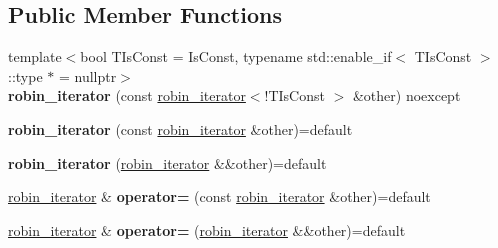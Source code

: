 \subsection*{Public Member Functions}
\begin{DoxyCompactItemize}
\item 
\mbox{\label{classtsl_1_1detail__robin__hash_1_1robin__hash_1_1robin__iterator_a902c3bd072c934ecacfdc474c7c3cb24}} 
{\footnotesize template$<$bool T\+Is\+Const = Is\+Const, typename std\+::enable\+\_\+if$<$ T\+Is\+Const $>$\+::type $\ast$  = nullptr$>$ }\\{\bfseries robin\+\_\+iterator} (const \mbox{\hyperlink{classtsl_1_1detail__robin__hash_1_1robin__hash_1_1robin__iterator}{robin\+\_\+iterator}}$<$!T\+Is\+Const $>$ \&other) noexcept
\item 
\mbox{\label{classtsl_1_1detail__robin__hash_1_1robin__hash_1_1robin__iterator_a6c26801686f10dfa7ead4c8ed5442e3d}} 
{\bfseries robin\+\_\+iterator} (const \mbox{\hyperlink{classtsl_1_1detail__robin__hash_1_1robin__hash_1_1robin__iterator}{robin\+\_\+iterator}} \&other)=default
\item 
\mbox{\label{classtsl_1_1detail__robin__hash_1_1robin__hash_1_1robin__iterator_a87ae6eb72c8d1b33f35319e44700e6f8}} 
{\bfseries robin\+\_\+iterator} (\mbox{\hyperlink{classtsl_1_1detail__robin__hash_1_1robin__hash_1_1robin__iterator}{robin\+\_\+iterator}} \&\&other)=default
\item 
\mbox{\label{classtsl_1_1detail__robin__hash_1_1robin__hash_1_1robin__iterator_a42971a6f97f25ea3dfc5cecb8aa8eb01}} 
\mbox{\hyperlink{classtsl_1_1detail__robin__hash_1_1robin__hash_1_1robin__iterator}{robin\+\_\+iterator}} \& {\bfseries operator=} (const \mbox{\hyperlink{classtsl_1_1detail__robin__hash_1_1robin__hash_1_1robin__iterator}{robin\+\_\+iterator}} \&other)=default
\item 
\mbox{\label{classtsl_1_1detail__robin__hash_1_1robin__hash_1_1robin__iterator_a59c32d6498517b4eae798fd2022e1474}} 
\mbox{\hyperlink{classtsl_1_1detail__robin__hash_1_1robin__hash_1_1robin__iterator}{robin\+\_\+iterator}} \& {\bfseries operator=} (\mbox{\hyperlink{classtsl_1_1detail__robin__hash_1_1robin__hash_1_1robin__iterator}{robin\+\_\+iterator}} \&\&other)=default

\end{DoxyCompactItemize}
